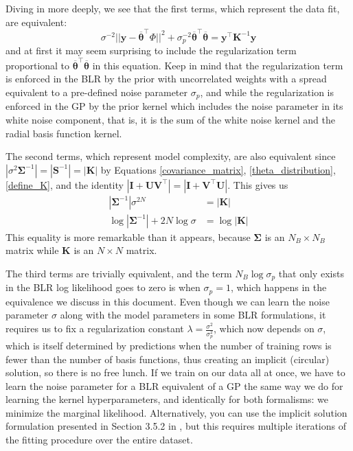 \documentclass{article}
\begin{document}
Diving in more deeply, we see that the first terms, which represent the data fit, are equivalent:
\begin{equation}
    \sigma^{-2}||\mathbf{y}-\overline{\boldsymbol{\theta}} ^\top \Phi ||^2 +\sigma_p^{-2} \overline{\boldsymbol{\theta}}^\top\overline{\boldsymbol{\theta}} = \mathbf{y}^\top \mathbf{K}^{-1} \mathbf{y} 
\end{equation}and at first it may seem surprising to include the regularization term proportional to $\overline{\boldsymbol{\theta}}^\top\overline{\boldsymbol{\theta}}$ in this equation. Keep in mind that the regularization term is enforced in the BLR by the prior with uncorrelated weights with a spread equivalent to a pre-defined noise parameter $\sigma_p$, and while the regularization is enforced in the GP by the prior kernel which includes the noise parameter in its white noise component, that is, it is the sum of the white noise kernel and the radial basis function kernel. 

The second terms, which represent model complexity, are also equivalent since $|\sigma^2\boldsymbol{\Sigma}^{-1}|=|\mathbf{S}^{-1}|=|\mathbf{K}|$ by Equations \ref{covariance_matrix}, \ref{theta_distribution}, \ref{define_K}, and the identity $|\mathbf{I}+\mathbf{UV}^\top|=|\mathbf{I}+\mathbf{V}^\top\mathbf{U}|$. This gives us
\begin{equation}
\begin{split}|\boldsymbol{\Sigma}^{-1}|\sigma^{2N}&=|\mathbf{K}|\\\log|\boldsymbol{\Sigma}^{-1}|+2N\log \sigma&=\log|\mathbf{K}|\end{split}\end{equation}This equality is more remarkable than it appears, because $\boldsymbol{\Sigma}$ is an $N_B\times N_B$ matrix while $\mathbf{K}$ is an $N\times N$ matrix. 

The third terms are trivially equivalent, and the term $N_B\log \sigma_p$ that only exists in the BLR log likelihood goes to zero is when $\sigma_p=1$, which happens in the equivalence we discuss in this document. Even though we can learn the noise parameter $\sigma$ along with the model parameters in some BLR formulations\cite{KoyoteScience}, it requires us to fix a regularization constant $\lambda=\frac{\sigma^2}{\sigma_p^2}$, which now depends on $\sigma$, which is itself determined by predictions when the number of training rows is fewer than the number of basis functions, thus creating an implicit (circular) solution, so there is no free lunch. If we train on our data all at once, we have to learn the noise parameter for a BLR equivalent of a GP the same way we do for learning the kernel hyperparameters, and identically for both formalisms: we minimize the marginal likelihood. Alternatively, you can use the implicit solution formulation presented in Section 3.5.2 in \cite{bishop}, but this requires multiple iterations of the fitting procedure over the entire dataset.
\end{document}
